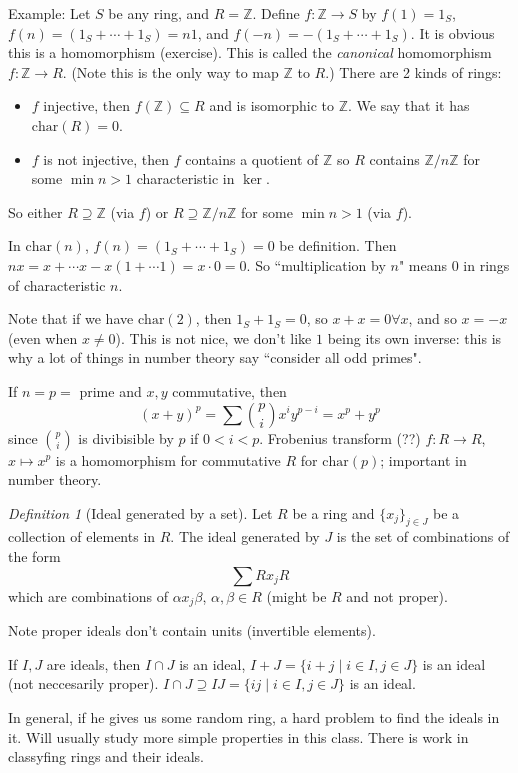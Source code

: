 \documentclass{article}
\theoremstyle{plain}
\theoremstyle{remark}
\newtheorem{definition}{Definition}
\newcommand{\Z}{{\mathbb Z}}
\begin{document}
Example: Let $S$ be any ring, and $R = \Z$.
Define $f \colon \Z \to S$ by $f(1) = 1_S$, $f(n) = (1_S + \cdots + 1_S) = n1$,
and $f(-n) = -(1_S + \cdots + 1_S)$.
It is obvious this is a homomorphism (exercise).
This is called the \emph{canonical} homomorphism $f \colon \Z \to R$.
(Note this is the only way to map $\Z$ to $R$.)
There are 2 kinds of rings:
\begin{itemize}
	\item $f$ injective, then $f(\Z) \subseteq R$ and is isomorphic to $\Z$.
		We say that it has $\mathrm{char}(R) = 0$.
	\item $f$ is not injective, then $f$ contains a quotient of $\Z$
		so $R$ contains $\Z/n\Z$ for some $\min{n}>1$ characteristic in $\ker$.
\end{itemize}
So either $R \supseteq \Z$ (via $f$) or $R \supseteq \Z/n\Z$ for some $\min{n} > 1$ (via $f$).

In $\mathrm{char}(n)$,
$f(n) = (1_S + \cdots + 1_S) = 0$ be definition.
Then $nx = x + \cdots  x - x(1 + \cdots 1) = x\cdot0 = 0$.
So ``multiplication by $n$" means $0$ in rings of characteristic $n$.

Note that if we have $\mathrm{char}(2)$, then $1_S + 1_S = 0$,
so $x + x = 0 \forall x$, and so $x = -x$ (even when $x \neq 0$).
This is not nice, we don't like $1$ being its own inverse:
this is why a lot of things in number theory say ``consider all odd primes".

If $n = p =$ prime and $x,y$ commutative, then
\[
	(x+y)^p = \sum\binom{p}{i}x^iy^{p-i} = x^p + y^p
\]
since $\binom{p}{i}$ is divibisible by $p$ if $0 < i < p$.
Frobenius transform (??) $f \colon R \to R$, $x \mapsto x^p$ is a homomorphism
for commutative $R$ for $\mathrm{char}(p)$;
important in number theory.

\begin{definition}[Ideal generated by a set]
	Let $R$ be a ring and $\{x_j\}_{j \in J}$ be a collection of elements in $R$.
	The ideal generated by $J$ is the set of combinations of the form
	\[
		\sum Rx_jR
	\]
	which are combinations of $\alpha x_j \beta$, $\alpha,\beta\in R$
	(might be $R$ and not proper).
\end{definition}
Note proper ideals don't contain units (invertible elements).

If $I,J$ are ideals, then $I \cap J$ is an ideal,
$I + J = \{ i + j \mid i \in I, j \in J\}$ is an ideal (not neccesarily proper).
$I \cap J \supseteq IJ = \{ij \mid i \in I, j \in J\}$ is an ideal.

In general, if he gives us some random ring,
a hard problem to find the ideals in it.
Will usually study more simple properties in this class.
There is work in classyfing rings and their ideals.
\end{document}
